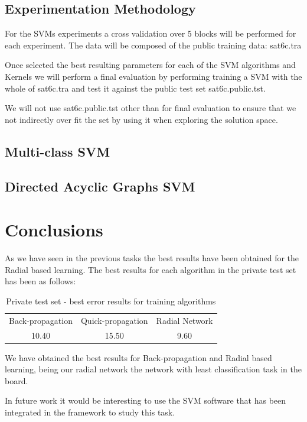 \documentclass[a4paper,10pt,titlepage]{article}
\begin{document}
\subsection{Experimentation Methodology}

\par For the SVMs experiments a cross validation over 5 blocks will be performed for each experiment. The data will be composed of the public training data: sat6c.tra

\par Once selected the best resulting parameters for each of the SVM algorithms and Kernels we will perform a final evaluation by performing training a SVM with the whole of sat6c.tra and test it against the public test set sat6c.public.tst.

\par We will not use sat6c.public.tst other than for final evaluation to ensure that we not indirectly over fit the set by using it when exploring the solution space. 

\subsection{Multi-class SVM}

\subsection{Directed Acyclic Graphs SVM}


\section{Conclusions}

\par As we have seen in the previous tasks the best results have been obtained for the Radial based learning. The best results for each algorithm in the private test set has been as follows: 

\begin{table}[H] 
\caption{Private test set - best error results for training algorithms} %
\centering 
\begin{tabular}{c c c} 
\hline\hline 
Back-propagation & Quick-propagation & Radial Network \\
10.40 & 15.50 &  9.60 \\

\hline 
\end{tabular} 
\label{tab:dist_result} 
\end{table}

\par We have obtained the best results for Back-propagation and Radial based learning, being our radial network the network with least classification task in the board.

\par In future work it would be interesting to use the SVM software that has been integrated in the framework to study this task.  
\end{document}
